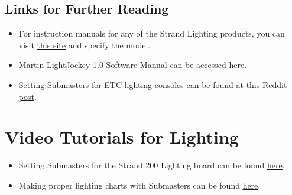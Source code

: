 \documentclass{article}
\begin{document}
\subsection{Links for Further Reading}
\begin{itemize}
    \item For instruction manuals for any of the Strand Lighting products, you can visit \href{http://www.strandlighting.com/support-documents/}{\underline{this site}} and specify the model.
    \item Martin LightJockey 1.0 Software Manual \href{http://www.martin.com/files/files/productdocuments/11_MANUALS/999/UM_LJ_EN_d.pdf}{\underline{can be accessed here}}.
    \item Setting Submasters for ETC lighting consoles can be found at  \href{https://www.reddit.com/r/techtheatre/comments/7qsf7d/etc_express_programming/?st=JCXGJGZI&sh=654a9e9b}{\underline{this Reddit post}}.
\end{itemize}

\section{Video Tutorials for Lighting}
\begin{itemize}
    \item Setting Submasters for the Strand 200 Lighting board can be found \href{https://m.youtube.com/watch?v=PftZWxb1ETA}{\underline{here}}.
    \item Making proper lighting charts with Submasters can be found \href{https://m.youtube.com/watch?v=jzFnM5nUZvY}{\underline{here}}.
\end{itemize}
\end{document}
